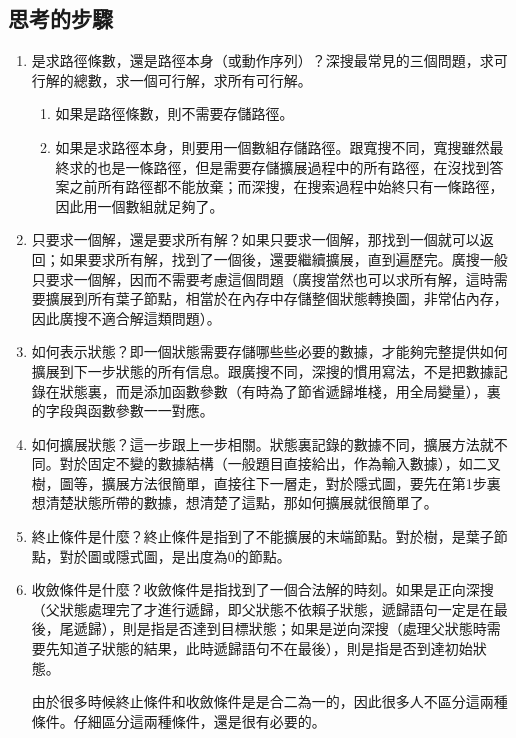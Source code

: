 \subsection{思考的步驟}
\begin{enumerate}
\item 是求路徑條數，還是路徑本身（或動作序列）？深搜最常見的三個問題，求可行解的總數，求一個可行解，求所有可行解。
    \begin{enumerate}
	\item 如果是路徑條數，則不需要存儲路徑。
    \item 如果是求路徑本身，則要用一個數組存儲路徑。跟寬搜不同，寬搜雖然最終求的也是一條路徑，但是需要存儲擴展過程中的所有路徑，在沒找到答案之前所有路徑都不能放棄；而深搜，在搜索過程中始終只有一條路徑，因此用一個數組就足夠了。
    \end{enumerate}

\item 只要求一個解，還是要求所有解？如果只要求一個解，那找到一個就可以返回；如果要求所有解，找到了一個後，還要繼續擴展，直到遍歷完。廣搜一般只要求一個解，因而不需要考慮這個問題（廣搜當然也可以求所有解，這時需要擴展到所有葉子節點，相當於在內存中存儲整個狀態轉換圖，非常佔內存，因此廣搜不適合解這類問題）。

\item 如何表示狀態？即一個狀態需要存儲哪些些必要的數據，才能夠完整提供如何擴展到下一步狀態的所有信息。跟廣搜不同，深搜的慣用寫法，不是把數據記錄在狀態裏，而是添加函數參數（有時為了節省遞歸堆棧，用全局變量），裏的字段與函數參數一一對應。

\item 如何擴展狀態？這一步跟上一步相關。狀態裏記錄的數據不同，擴展方法就不同。對於固定不變的數據結構（一般題目直接給出，作為輸入數據），如二叉樹，圖等，擴展方法很簡單，直接往下一層走，對於隱式圖，要先在第1步裏想清楚狀態所帶的數據，想清楚了這點，那如何擴展就很簡單了。

\item 終止條件是什麼？終止條件是指到了不能擴展的末端節點。對於樹，是葉子節點，對於圖或隱式圖，是出度為0的節點。

\item {收斂條件是什麼？收斂條件是指找到了一個合法解的時刻。如果是正向深搜（父狀態處理完了才進行遞歸，即父狀態不依賴子狀態，遞歸語句一定是在最後，尾遞歸），則是指是否達到目標狀態；如果是逆向深搜（處理父狀態時需要先知道子狀態的結果，此時遞歸語句不在最後），則是指是否到達初始狀態。

由於很多時候終止條件和收斂條件是是合二為一的，因此很多人不區分這兩種條件。仔細區分這兩種條件，還是很有必要的。

}
\end{enumerate}
